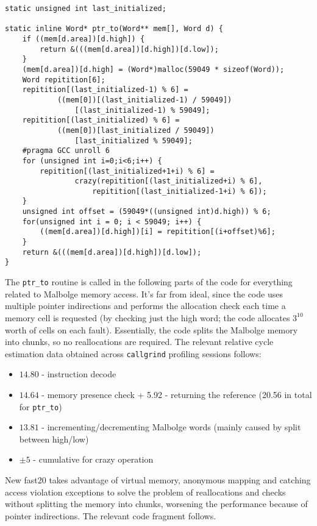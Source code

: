 \begin{verbatim}
static unsigned int last_initialized;

static inline Word* ptr_to(Word** mem[], Word d) {
    if ((mem[d.area])[d.high]) {
        return &(((mem[d.area])[d.high])[d.low]);
    }
    (mem[d.area])[d.high] = (Word*)malloc(59049 * sizeof(Word));
    Word repitition[6];
    repitition[(last_initialized-1) % 6] =
            ((mem[0])[(last_initialized-1) / 59049])
                [(last_initialized-1) % 59049];
    repitition[(last_initialized) % 6] =
            ((mem[0])[last_initialized / 59049])
                [last_initialized % 59049];
    #pragma GCC unroll 6
    for (unsigned int i=0;i<6;i++) {
        repitition[(last_initialized+1+i) % 6] =
                crazy(repitition[(last_initialized+i) % 6],
                    repitition[(last_initialized-1+i) % 6]);
    }
    unsigned int offset = (59049*((unsigned int)d.high)) % 6;
    for(unsigned int i = 0; i < 59049; i++) {
        ((mem[d.area])[d.high])[i] = repitition[(i+offset)%6];
    }
    return &(((mem[d.area])[d.high])[d.low]);
}
\end{verbatim}

\par The \verb|ptr_to| routine is called in the following parts of the code for everything related to Malbolge memory access. It's far from ideal, since the code uses multiple pointer indirections and performs the allocation check each time a memory cell is requested (by checking just the high word; the code allocates $3^{10}$ worth of cells on each fault). Essentially, the code splits the Malbolge memory into chunks, so no reallocations are required. The relevant relative cycle estimation data obtained across \verb|callgrind| profiling sessions follows:

\begin{itemize}
    \item $14.80$ - instruction decode
    \item $14.64$ - memory presence check + 5.92 - returning the reference (20.56 in total for \verb|ptr_to|)
    \item $13.81$ - incrementing/decrementing Malbolge words (mainly caused by split between high/low)
    \item $\pm5$ - cumulative for crazy operation
\end{itemize}

\par New fast20 takes advantage of virtual memory, anonymous mapping and catching access violation exceptions to solve the problem of reallocations and checks without splitting the memory into chunks, worsening the performance because of pointer indirections. The relevant code fragment follows.

